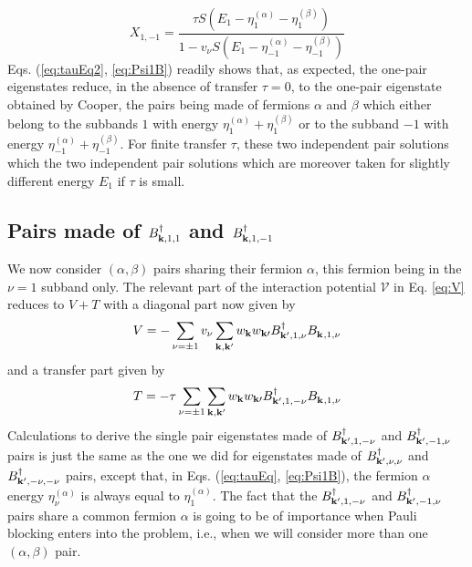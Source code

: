 \documentclass[11pt]{article} %
\begin{document}
\begin{equation}
X_{1,-1}=\frac{\tau{}S(E_1-\eta_{1}^{(\alpha)}-\eta_{1}^{(\beta)})}{1-v_{\nu}S(E_1-\eta_{-1}^{(\alpha)}-\eta_{-1}^{(\beta)})}
\end{equation}
Eqs. (\ref{eq:tauEq2}, \ref{eq:Psi1B}) readily shows that, as expected, the one-pair eigenstates reduce, in the absence of transfer $\tau=0$, to the one-pair eigenstate obtained by Cooper, the pairs being made of fermions $\alpha$ and $\beta$ which either belong to the subbands $1$ with energy $\eta^{(\alpha)}_{1}+\eta^{(\beta)}_{1}$ or to the subband $-1$ with energy $\eta^{(\alpha)}_{-1}+\eta^{(\beta)}_{-1}$.  For finite transfer $\tau$,  these two independent  pair solutions which the two independent pair solutions which are moreover taken for slightly different energy $E_{1}$ if $\tau$ is small. 

\subsection{Pairs made of $B^{\dagger}_{\mathbf{k},1,1}$ and $B^{\dagger}_{\mathbf{k},1,-1}$}
We now consider $(\alpha,\beta)$ pairs sharing their fermion $\alpha$, this fermion being in the $\nu=1$ subband only.  The relevant part of the interaction potential $\mathcal{V}$ in Eq. \ref{eq:V} reduces to $V+T$ with a diagonal part now given by  
\begin{equation}
V=-\sum_{\nu=\pm1}v_{\nu}\sum_{\mathbf{k},\mathbf{k}^{{\prime}}}
w_{\mathbf{k}}w_{\mathbf{k}{\prime}}
B^{\dagger}_{\mathbf{k}^{{\prime}},1,\nu}
B^{}_{\mathbf{k}^{ },1,\nu}
\end{equation}
and a transfer part given by 
\begin{equation}
T=-\tau\sum_{\nu=\pm1}\sum_{\mathbf{k},\mathbf{k}^{{\prime}}}
w_{\mathbf{k}}w_{\mathbf{k}{\prime}}
B^{\dagger}_{\mathbf{k}^{{\prime}},1,-\nu}
B^{}_{\mathbf{k}^{ },1,\nu}
\end{equation}
Calculations to derive the single pair eigenstates made of $B^{\dagger}_{\mathbf{k}^{{\prime}},1,-\nu}$ and $B^{\dagger}_{\mathbf{k}^{{\prime}},-1,\nu}$ pairs is just the same as the one we did for eigenstates made of $B^{\dagger}_{\mathbf{k}^{{\prime}},\nu,\nu}$ and $B^{\dagger}_{\mathbf{k}^{{\prime}},-\nu,-\nu}$ pairs, except that, in Eqs. (\ref{eq:tauEq}, \ref{eq:Psi1B}), the fermion $\alpha$ energy $\eta^{(\alpha)}_{\nu}$ is always equal to   $\eta^{(\alpha)}_1$.  The fact that the $B^{\dagger}_{\mathbf{k}^{{\prime}},1,-\nu}$ and $B^{\dagger}_{\mathbf{k}^{{\prime}},-1,\nu}$ pairs share a common fermion $\alpha$ is going to be of importance when Pauli blocking enters into the problem, i.e., when we will consider more than one $(\alpha,\beta)$ pair.  
\end{document}
